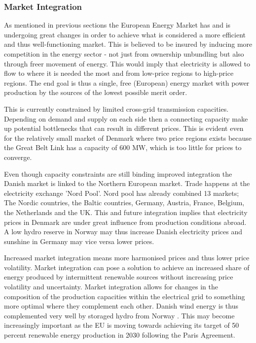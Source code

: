 \subsubsection{Market Integration}
\label{subsec:t_EU}
As mentioned in previous sections the European Energy Market has and is undergoing great changes in order to achieve what is considered a more efficient and thus well-functioning market. This is believed to be insured by inducing more competition in the energy sector - not just from ownership unbundling but also through freer movement of energy. This would imply that electricity is allowed to flow to where it is needed the most and from low-price regions to high-price regions. The end goal is thus a single, free (European) energy market with power production by the sources of the lowest possible merit order.
\par
This is currently constrained by limited cross-grid transmission capacities. Depending on demand and supply on each side then a connecting capacity make up potential bottlenecks that can result in different prices.%
This is evident even for the relatively small market of Denmark where two price regions exists because the Great Belt Link has a capacity of 600 MW, which is too little for prices to converge. \bigskip \par
Even though capacity constraints are still binding improved integration the Danish market is linked to the Northern European market. Trade happens at the electricity exchange 'Nord Pool'. Nord pool has already combined 13 markets; The Nordic countries, the Baltic countries, Germany, Austria, France, Belgium, the Netherlands and the UK.  This and future integration implies that electricity prices in Denmark are under great influence from production conditions abroad. A low hydro reserve in Norway may thus increase Danish electricity prices and sunshine in Germany may vice versa lower prices. \bigskip \par
Increased market integration means more harmonised prices and thus lower price volatility. Market integration can pose a solution to achieve an increased share of energy produced by intermittent renewable sources without increasing price volatility and uncertainty. Market integration allows for changes in the composition of the production capacities within the electrical grid to something more optimal where they complement each other. Danish wind energy is thus complemented very well by storaged hydro from Norway \citep{ambec2012electricity}.  This may become increasingly important as the EU is moving towards achieving its target of 50 percent renewable energy production in 2030 following the Paris Agreement.

